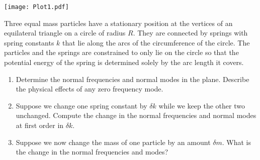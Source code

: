 \documentclass{jhwhw}
\begin{document}
\begin{center}
  \texttt{[image: Plot1.pdf]}
\end{center}


Three equal mass particles have a stationary position at the vertices of an equilateral triangle on a circle of radius $R$.
They are connected by springs with spring constants $k$ that lie along the arcs of the circumference of the circle.
The particles and the springs are constrained to only lie on the circle so that the potential energy of the spring is determined solely by the arc length it covers.
\begin{enumerate}
  \item Determine the normal frequencies and normal modes in the plane. Describe the physical effects of any zero frequency mode.
  \item Suppose we change one spring constant by $\delta k$ while we keep the other two unchanged. Compute the change in the normal frequencies and normal modes at first order in $\delta k$.
  \item Suppose we now change the mass of one particle by an amount $\delta m$. What is the change in the normal frequencies and modes?
\end{enumerate}
\end{document}

